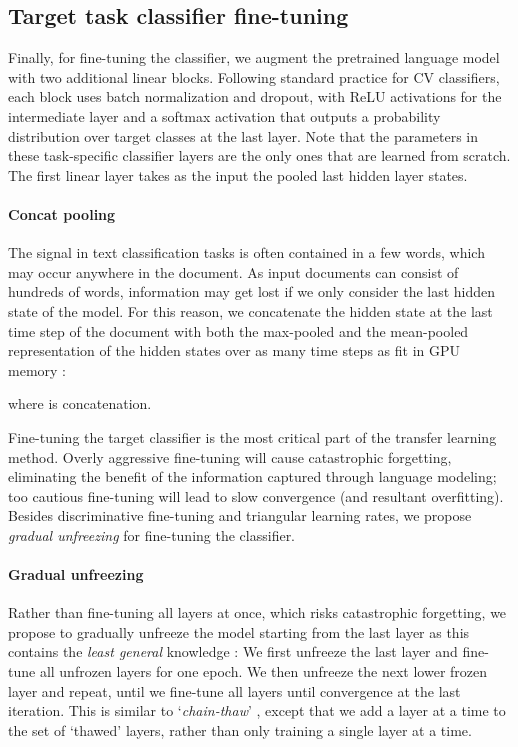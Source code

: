 \documentclass[11pt,a4paper]{article}
\begin{document}
\subsection{Target task classifier fine-tuning} \label{sec:clas-fine-tuning}

Finally, for fine-tuning the classifier, we augment the pretrained language model with two additional linear blocks. 
Following standard practice for CV classifiers, each block uses batch normalization \cite{ioffe2015batch} and dropout, with ReLU activations for the intermediate layer and a softmax activation that outputs a probability distribution over target classes at the last layer. Note that the parameters in these task-specific classifier layers are the only ones that are learned from scratch. The first linear layer takes as the input the pooled last hidden layer states.

\paragraph{Concat pooling} The signal in text classification tasks is often contained in a few words, which may occur anywhere in the document. As input documents can consist of hundreds of words, information may get lost if we only consider the last hidden state of the model. For this reason, we concatenate the hidden state at the last time step  of the document with both the max-pooled and the mean-pooled representation of the hidden states over as many time steps as fit in GPU memory :

where  is concatenation.

Fine-tuning the target classifier is the most critical part of the transfer learning method. Overly aggressive fine-tuning will cause catastrophic forgetting, eliminating the benefit of the information captured through language modeling; too cautious fine-tuning will lead to slow convergence (and resultant overfitting). Besides discriminative fine-tuning and triangular learning rates, we propose \emph{gradual unfreezing} for fine-tuning the classifier.

\paragraph{Gradual unfreezing} Rather than fine-tuning all layers at once, which risks catastrophic forgetting, we propose to gradually unfreeze the model starting from the last layer as this contains the \emph{least general} knowledge \cite{yosinski2014transferable}: We first unfreeze the last layer and fine-tune all unfrozen layers for one epoch. We then unfreeze the next lower frozen layer and repeat, until we fine-tune all layers until convergence at the last iteration. This is similar to `\emph{chain-thaw}' \cite{Felbo2017}, except that we add a layer at a time to the set of `thawed' layers, rather than only training a single layer at a time. 
\end{document}
